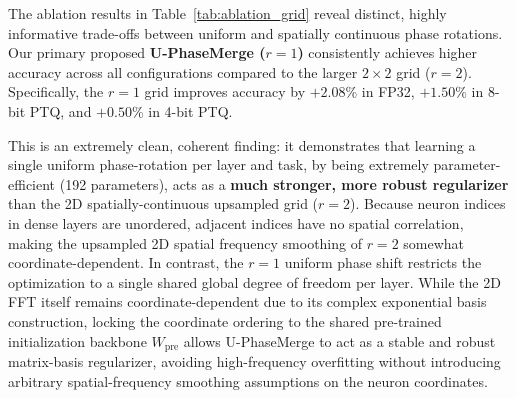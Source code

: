 \begin{table}[ht]
\caption{Ablation Study: Multi-Task average accuracy (\%) of PhaseMerge under grid sizes $r=1$ (192-D uniform phase-shift) and $r=2$ (768-D bilinear frequency smoothing grid) optimized at $M=16$.}
\label{tab:ablation_grid}
\vskip 0.15in
\begin{center}
\begin{small}
\begin{sc}
\end{sc}
\end{small}
\end{center}
\vskip -0.1in
\end{table}

The ablation results in Table~\ref{tab:ablation_grid} reveal distinct, highly informative trade-offs between uniform and spatially continuous phase rotations. Our primary proposed \textbf{U-PhaseMerge ($r=1$)} consistently achieves higher accuracy across all configurations compared to the larger $2\times 2$ grid ($r=2$). Specifically, the $r=1$ grid improves accuracy by $+2.08\%$ in FP32, $+1.50\%$ in 8-bit PTQ, and $+0.50\%$ in 4-bit PTQ. 

This is an extremely clean, coherent finding: it demonstrates that learning a single uniform phase-rotation per layer and task, by being extremely parameter-efficient (192 parameters), acts as a \textbf{much stronger, more robust regularizer} than the 2D spatially-continuous upsampled grid ($r=2$). Because neuron indices in dense layers are unordered, adjacent indices have no spatial correlation, making the upsampled 2D spatial frequency smoothing of $r=2$ somewhat coordinate-dependent. In contrast, the $r=1$ uniform phase shift restricts the optimization to a single shared global degree of freedom per layer. While the 2D FFT itself remains coordinate-dependent due to its complex exponential basis construction, locking the coordinate ordering to the shared pre-trained initialization backbone $W_{\text{pre}}$ allows U-PhaseMerge to act as a stable and robust matrix-basis regularizer, avoiding high-frequency overfitting without introducing arbitrary spatial-frequency smoothing assumptions on the neuron coordinates.

